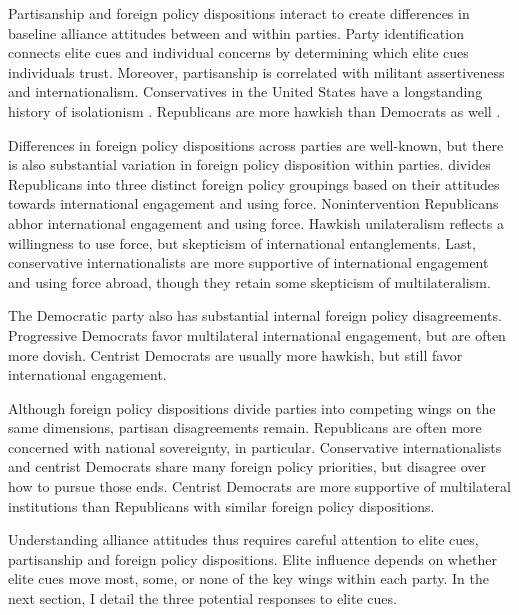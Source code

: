 \documentclass[12pt]{article}
\begin{document}
Partisanship and foreign policy dispositions interact to create differences in baseline alliance attitudes between and within parties. 
Party identification connects elite cues and individual concerns by determining which elite cues individuals trust.
Moreover, partisanship is correlated with militant assertiveness and internationalism. 
Conservatives in the United States have a longstanding history of isolationism \citep{Kupchan2020}.
Republicans are more hawkish than Democrats as well \citep{Gries2014}. 


Differences in foreign policy dispositions across parties are well-known, but there is also substantial variation in foreign policy disposition within parties.
\citep{Dueck2019} divides Republicans into three distinct foreign policy groupings based on their attitudes towards international engagement and using force.%
Nonintervention Republicans abhor international engagement and using force.
Hawkish unilateralism reflects a willingness to use force, but skepticism of international entanglements. 
Last, conservative internationalists are more supportive of international engagement and using force abroad, though they retain some skepticism of multilateralism.


The Democratic party also has substantial internal foreign policy disagreements. 
Progressive Democrats favor multilateral international engagement, but are often more dovish.
Centrist Democrats are usually more hawkish, but still favor international engagement. 


Although foreign policy dispositions divide parties into competing wings on the same dimensions, partisan disagreements remain. 
Republicans are often more concerned with national sovereignty, in particular. 
Conservative internationalists and centrist Democrats share many foreign policy priorities, but disagree over how to pursue those ends.
Centrist Democrats are more supportive of multilateral institutions than Republicans with similar foreign policy dispositions. 


Understanding alliance attitudes thus requires careful attention to elite cues, partisanship and foreign policy dispositions. 
Elite influence depends on whether elite cues move most, some, or none of the key wings within each party. 
In the next section, I detail the three potential responses to elite cues. 
\end{document}
